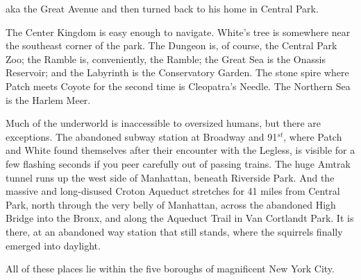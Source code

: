\documentclass[11pt]{article}
\begin{document}
 aka the Great Avenue %
 and then turned back to his home in Central Park.\par
The Center Kingdom is easy enough to navigate. White's tree is somewhere near the southeast corner of the park. The Dungeon is, of course, the Central Park Zoo; the Ramble is, conveniently, the Ramble; the Great Sea is the Onassis Reservoir; and the Labyrinth is the Conservatory Garden. The stone spire where Patch meets Coyote for the second time is Cleopatra's Needle. The Northern Sea is the Harlem Meer.\par
Much of the underworld is inaccessible to oversized humans, but there are exceptions. The abandoned subway station at Broadway and 91$^{st}$, where Patch and White found themselves after their encounter with the Legless, is visible for a few flashing seconds if you peer carefully out of passing trains. The huge Amtrak tunnel runs up the west side of Manhattan, beneath Riverside Park. And the massive and long-disused Croton Aqueduct stretches for 41 miles from Central Park, north through the very belly of Manhattan, across the abandoned High Bridge into the Bronx, and along the Aqueduct Trail in Van Cortlandt Park. It is there, at an abandoned way station that still stands, where the squirrels finally emerged into daylight.\par
All of these places lie within the five boroughs of magnificent New York City.\par
\par
{}
\par
\par
\par
\end{document}
